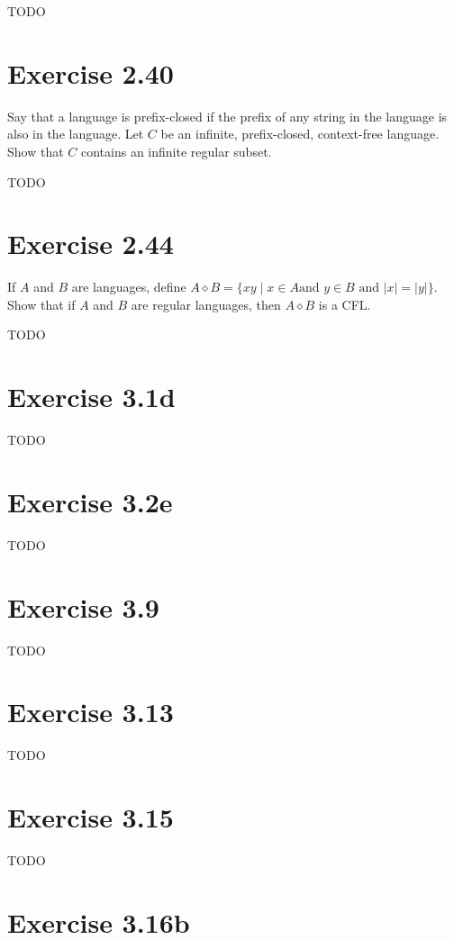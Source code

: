 \documentclass{article}
\newcommand{\where}{\mid}
\begin{document}
TODO

\section{Exercise 2.40}

Say that a language is prefix-closed if the prefix of any string in the language
is also in the language. Let $C$ be an infinite, prefix-closed, context-free
language. Show that $C$ contains an infinite regular subset.

TODO 

\section{Exercise 2.44}

If $A$ and $B$ are languages, define $A \diamond B = \{xy \where x \in A \text{
and } y \in B \text{ and } |x| = |y|\}$. Show that if $A$ and $B$ are regular
languages, then $A \diamond B$ is a CFL.

TODO 

\section{Exercise 3.1d}

TODO 

\section{Exercise 3.2e}

TODO 

\section{Exercise 3.9}

TODO 

\section{Exercise 3.13}

TODO 

\section{Exercise 3.15}

TODO 

\section{Exercise 3.16b}
\end{document}
